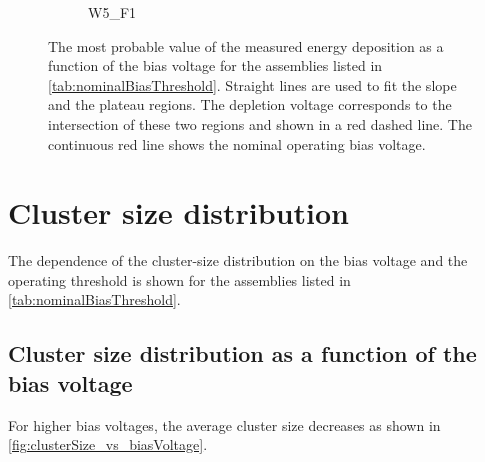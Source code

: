 \begin{figure}[htbp]
\begin{subfigure}[b]{0.33\textwidth}
    \caption{W5\_F1}
  \end{subfigure}%
  \caption{The most probable value of the measured energy deposition
    as a function of the bias voltage for the assemblies listed in
    \cref{tab:nominalBiasThreshold}. Straight lines are used to fit
    the slope and the plateau regions. The depletion voltage
    corresponds to the intersection of these two regions and shown in
    a red dashed line. The continuous red line shows the nominal
    operating bias voltage.}
  \label{fig:depletionVoltage}
\end{figure}


\newpage
\section{Cluster size distribution}

The dependence of the cluster-size distribution on the bias voltage
and the operating threshold is shown for the assemblies listed in
\cref{tab:nominalBiasThreshold}.

\subsection{Cluster size distribution as a function of the bias
  voltage}

For higher bias voltages, the average cluster size decreases as shown
in \cref{fig:clusterSize_vs_biasVoltage}.

